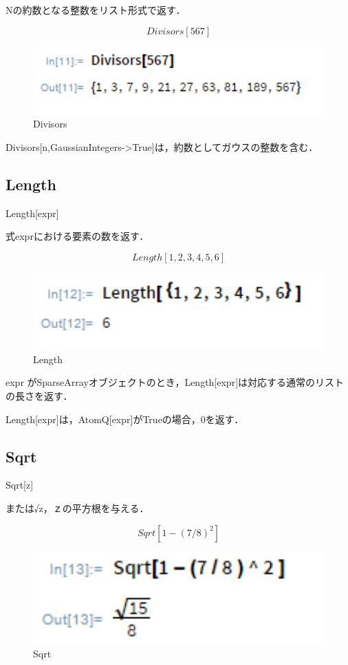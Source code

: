 Nの約数となる整数をリスト形式で返す．

\[Divisors[567]\]

\begin{figure}[h]
\centering
\includegraphics[width=15cm]{divisors.png}
\caption{Divisors}\label{図}
\end{figure}

Divisors[n,GaussianIntegers->True]は，約数としてガウスの整数を含む．



\subsection {Length}

Length[expr]

式exprにおける要素の数を返す．

\[Length[{1,2,3,4,5,6}]\]

\begin{figure}[h]
\centering
\includegraphics[width=15cm]{length.png}
\caption{Length}\label{図}
\end{figure}

expr がSparseArrayオブジェクトのとき，Length[expr]は対応する通常のリストの長さを返す．

Length[expr]は，AtomQ[expr]がTrueの場合，0を返す．

\clearpage

\subsection {Sqrt}

Sqrt[z]

または√z，ｚの平方根を与える．

\[Sqrt[1-(7/8 )^2 ]\]

\begin{figure}[h]
\centering
\includegraphics[width=15cm]{sqrt.png}
\caption{Sqrt}\label{図}
\end{figure}


